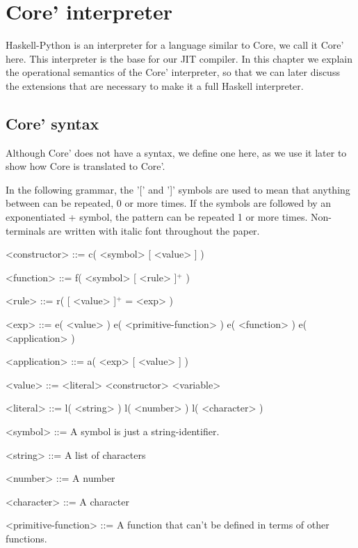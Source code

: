 
\chapter{Core' interpreter}

Haskell-Python is an interpreter for a language similar to Core, we call it Core' here.
This interpreter is the base for our JIT compiler. In this chapter we explain the 
operational semantics of the Core' interpreter, so that we can later discuss the 
extensions that are necessary to make it a full Haskell interpreter.


\section{Core' syntax}

Although Core' does not have a syntax, we define one here, as we use it later 
to show how Core is translated to Core'.

In the following grammar, the '[' and ']' symbols are used to mean that
anything between can be repeated, 0 or more times. If the symbols are followed by an
exponentiated + symbol, the pattern can be repeated 1 or more times. Non-terminals are 
written with italic font throughout the paper.

\begin{grammar}

<constructor> ::= c( <symbol> [ <value> ] )

<function> ::= f( <symbol> [ <rule> ]$^+$ )

<rule> ::= r( [ <value> ]$^+$ = <exp> )

<exp> ::= e( <value> )
     \alt e( <primitive-function> )
     \alt e( <function> )
     \alt e( <application> )

<application> ::= a( <exp> [ <value> ] )

<value> ::= <literal>
       \alt <constructor>
       \alt <variable>

<literal> ::= l( <string> )
	 \alt l( <number> )
	 \alt l( <character> )

<symbol> ::= A symbol is just a string-identifier.

<string> ::= A list of characters

<number> ::= A number

<character> ::= A character

<primitive-function> ::= A function that can't be defined in terms of other functions.

\end{grammar}


